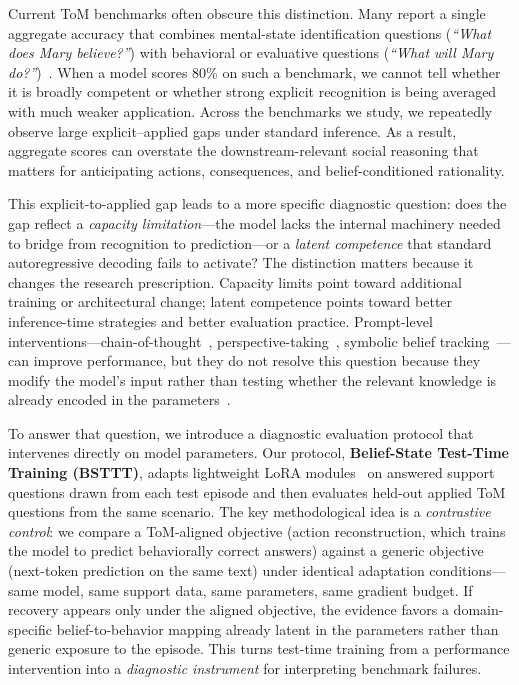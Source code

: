 \documentclass{article}
\begin{document}
Current ToM benchmarks often obscure this distinction.
Many report a single aggregate accuracy that combines mental-state identification questions (\emph{``What does Mary believe?''}) with behavioral or evaluative questions (\emph{``What will Mary do?''})~\citep{kosinski2024evaluating, strachan2024testing, sap2022neural}.
When a model scores 80\% on such a benchmark, we cannot tell whether it is broadly competent or whether strong explicit recognition is being averaged with much weaker application.
Across the benchmarks we study, we repeatedly observe large explicit--applied gaps under standard inference.
As a result, aggregate scores can overstate the downstream-relevant social reasoning that matters for anticipating actions, consequences, and belief-conditioned rationality.

This explicit-to-applied gap leads to a more specific diagnostic question: does the gap reflect a \emph{capacity limitation}---the model lacks the internal machinery needed to bridge from recognition to prediction---or a \emph{latent competence} that standard autoregressive decoding fails to activate?
The distinction matters because it changes the research prescription.
Capacity limits point toward additional training or architectural change; latent competence points toward better inference-time strategies and better evaluation practice.
Prompt-level interventions---chain-of-thought~\citep{wei2022chain}, perspective-taking~\citep{wilf2024think}, symbolic belief tracking~\citep{sclar-etal-2023-minding}---can improve performance, but they do not resolve this question because they modify the model's input rather than testing whether the relevant knowledge is already encoded in the parameters~\citep{gu2024simpletom}.

To answer that question, we introduce a diagnostic evaluation protocol that intervenes directly on model parameters.
Our protocol, \textbf{Belief-State Test-Time Training (BSTTT)}, adapts lightweight LoRA modules~\citep{hu2022lora} on answered support questions drawn from each test episode and then evaluates held-out applied ToM questions from the same scenario.
The key methodological idea is a \emph{contrastive control}: we compare a ToM-aligned objective (action reconstruction, which trains the model to predict behaviorally correct answers) against a generic objective (next-token prediction on the same text) under identical adaptation conditions---same model, same support data, same parameters, same gradient budget.
If recovery appears only under the aligned objective, the evidence favors a domain-specific belief-to-behavior mapping already latent in the parameters rather than generic exposure to the episode.
This turns test-time training from a performance intervention into a \emph{diagnostic instrument} for interpreting benchmark failures.
\end{document}
